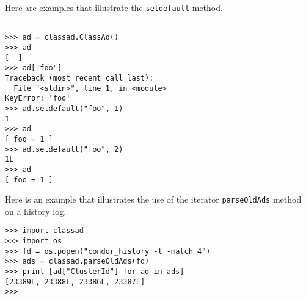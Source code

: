 Here are examples that illustrate the \texttt{setdefault} method.
\footnotesize
\begin{verbatim}

>>> ad = classad.ClassAd()
>>> ad
[  ]
>>> ad["foo"]
Traceback (most recent call last):
  File "<stdin>", line 1, in <module>
KeyError: 'foo'
>>> ad.setdefault("foo", 1)
1
>>> ad
[ foo = 1 ]
>>> ad.setdefault("foo", 2)
1L
>>> ad
[ foo = 1 ]

\end{verbatim}
\normalsize

Here is an example that illustrates the use of the iterator
\texttt{parseOldAds} method on a history log.
\footnotesize
\begin{verbatim}
>>> import classad
>>> import os
>>> fd = os.popen("condor_history -l -match 4")
>>> ads = classad.parseOldAds(fd)
>>> print [ad["ClusterId"] for ad in ads]
[23389L, 23388L, 23386L, 23387L]
>>>
\end{verbatim}
\normalsize
